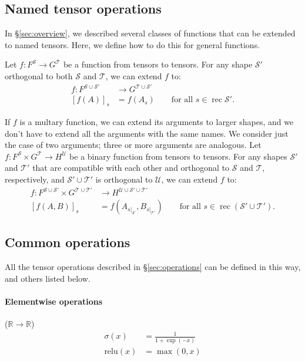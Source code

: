 \documentclass{article}
\DeclareMathOperator{\rec}{rec}
\newcommand{\restrict}[2]{\mathopen{}\left.#1\right|_{#2}}
\newcommand{\reals}{\mathbb{R}}
\begin{document}
\subsection{Named tensor operations}
\label{sec:tensorfunctions}

In \S\ref{sec:overview}, we described several classes of functions that can be extended to named tensors. Here, we define how to do this for general functions.

Let $f \colon F^{\mathcal{S}} \rightarrow G^{\mathcal{T}}$ be a function from tensors to tensors. For any shape $\mathcal{S'}$ orthogonal to both $\mathcal{S}$ and $\mathcal{T}$, we can extend $f$ to:
\begin{align*}
f \colon F^{\mathcal{S} \cup \mathcal{S'}} &\rightarrow G^{\mathcal{T} \cup \mathcal{S'}} \\
[f(A)]_s &= f(A_s) \qquad \text{for all $s \in \rec\mathcal{S'}$.}
\end{align*}

If $f$ is a multary function, we can extend its arguments to larger shapes, and we don't have to extend all the arguments with the same names. We consider just the case of two arguments; three or more arguments are analogous. Let $f \colon F^{\mathcal{S}} \times G^{\mathcal{T}} \rightarrow H^{\mathcal{U}}$ be a binary function from tensors to tensors. For any shapes $\mathcal{S'}$ and $\mathcal{T'}$ that are compatible with each other and orthogonal to $\mathcal{S}$ and $\mathcal{T}$, respectively, and $\mathcal{S'} \cup \mathcal{T'}$ is orthogonal to $\mathcal{U}$, we can extend $f$ to:
\begin{align*}
f \colon F^{\mathcal{S} \cup \mathcal{S'}} \times G^{\mathcal{T} \cup \mathcal{T'}} &\rightarrow H^{\mathcal{U} \cup \mathcal{S'} \cup \mathcal{T'}} \\
  [f(A,B)]_s &= f\left(A_{\restrict{s}{\mathcal{S'}}},B_{\restrict{s}{\mathcal{T'}}}\right) \qquad \text{for all $s \in \rec (\mathcal{S'} \cup \mathcal{T'})$.}
\end{align*}

\subsection{Common operations}
\label{sec:commonops}

All the tensor operations described in \S\ref{sec:operations} can be defined in this way, and others listed below.

\paragraph{Elementwise operations} ($\reals \rightarrow \reals$)
\begin{align*}
  \sigma(x) &= \frac{1}{1+\exp(-x)} \\
  \text{relu}(x) &= \max(0, x)
\end{align*}
\end{document}
